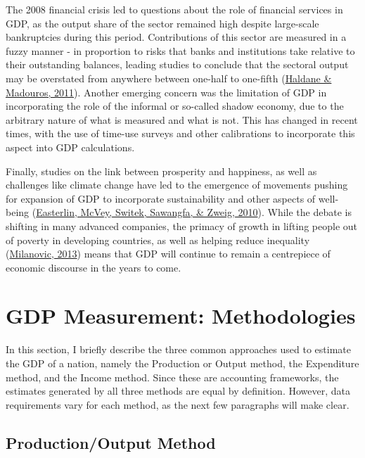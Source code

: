 \documentclass[12pt,nobind, a4paper]{reedthesis}
\begin{document}
 The 2008 financial crisis led to questions about the role of financial services in GDP, as the output share of the sector remained high despite large-scale bankruptcies during this period. Contributions of this sector are measured in a fuzzy manner - in proportion to risks that banks and institutions take relative to their outstanding balances, leading studies to conclude that the sectoral output may be overstated from anywhere between one-half to one-fifth (\protect\hyperlink{ref-haldane_what_2011}{Haldane \& Madouros, 2011}). Another emerging concern was the limitation of GDP in incorporating the role of the informal or so-called shadow economy, due to the arbitrary nature of what is measured and what is not. This has changed in recent times, with the use of time-use surveys and other calibrations to incorporate this aspect into GDP calculations.
 \linebreak

 Finally, studies on the link between prosperity and happiness, as well as challenges like climate change have led to the emergence of movements pushing for expansion of GDP to incorporate sustainability and other aspects of well-being (\protect\hyperlink{ref-easterlin_happinessincome_2010}{Easterlin, McVey, Switek, Sawangfa, \& Zweig, 2010}). While the debate is shifting in many advanced companies, the primacy of growth in lifting people out of poverty in developing countries, as well as helping reduce inequality (\protect\hyperlink{ref-milanovic_global_2013}{Milanovic, 2013}) means that GDP will continue to remain a centrepiece of economic discourse in the years to come.

 \hypertarget{meth}{%
 \section{GDP Measurement: Methodologies}\label{meth}}

 In this section, I briefly describe the three common approaches used to estimate the GDP of a nation, namely the Production or Output method, the Expenditure method, and the Income method. Since these are accounting frameworks, the estimates generated by all three methods are equal by definition. However, data requirements vary for each method, as the next few paragraphs will make clear.

 \hypertarget{productionoutput-method}{%
 \subsection{Production/Output Method}\label{productionoutput-method}}
\end{document}
